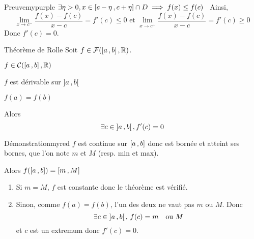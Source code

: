     \begin{demo}{Preuve}{mypurple}
        $\exists \eta > 0, x \in \left[ c-\eta \, , c + \eta \right] \cap D \implies f(x) \leq f(c)$
        \
        Ainsi, \[ \lim\limits_{x \rightarrow c^-} \frac{f(x)-f(c)}{x-c} = f'(c) \leq 0 \text{ et } \lim\limits_{x \rightarrow c^+} \frac{f(x)-f(c)}{x-c} = f'(c) \geq 0 \]
        Donc $f'(c) = 0$.
    \end{demo}

    \begin{theo}{Théorème de Rolle}{}
        Soit $f \in \mathcal{F}(\left[ a \, , b \right],\mathbb{R})$. 

        \begin{suppose}
            \item $f \in \mathcal{C}(\left[ a \, , b \right],\mathbb{R})$
            \item $f$ est dérivable sur $\left] a \, , b \right[$
            \item $f(a) = f(b)$
        \end{suppose}
        Alors \[ \exists c \in \left] a \, , b \right[, f'(c)= 0 \]
    \end{theo}

    \begin{demo}{Démonstration}{myred}
        $f$ est continue sur $\left[ a \, , b \right]$ donc est bornée et atteint ses bornes, que l’on note $m$ et $M$ (resp. min et max).
        
        Alors $f(\left[ a \, , b \right]) = \left[ m \, , M \right]$
        \begin{enumerate}
            \item Si $m = M$, $f$ est constante donc le théorème est vérifié.
            \item Sinon, comme $f(a) = f(b)$, l’un des deux ne vaut pas $m$ ou $M$. Donc \[ \exists c \in \left] a \, , b \right[, \, f(c) = m \quad \text{ou } M \] 
            et $c$ est un extremum donc $f'(c) = 0$.
        \end{enumerate}
    \end{demo}

